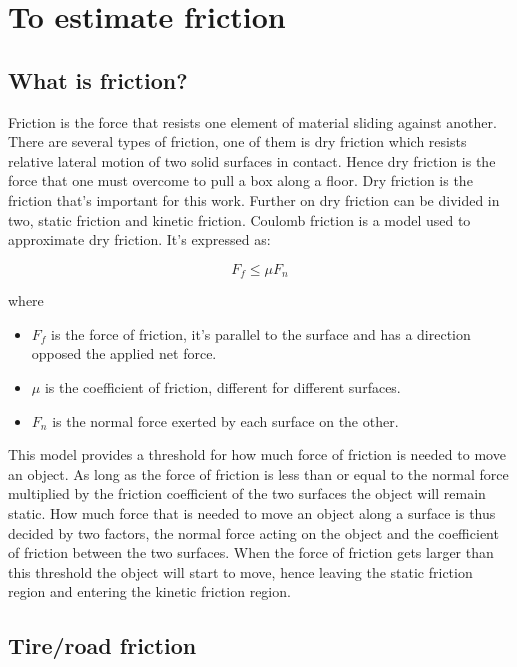\chapter{To estimate friction}

\section{What is friction?}
Friction is the force that resists one element of material sliding against another. There are several types of friction, one of them is dry friction which resists relative lateral motion of two solid surfaces in contact. Hence dry friction is the force that one must overcome to pull a box along a floor. Dry friction is the friction that's important for this work. Further on dry friction can be divided in two, static friction and kinetic friction. Coulomb friction is a model used to approximate dry friction. It's expressed as:

\begin{equation}
F_{f}\leq\mu F_{n}
\end{equation}

where

\begin{itemize}
	\item $ F_{f} $ is the force of friction, it's parallel to the surface and has a direction opposed the applied net force.
	\item $ \mu $ is the coefficient of friction, different for different surfaces.
	\item $ F_{n} $ is the normal force exerted by each surface on the other.
\end{itemize}

This model provides a threshold for how much force of friction is needed to move an object. As long as the force of friction is less than or equal to the normal force multiplied by the friction coefficient of the two surfaces the object will remain static. How much force that is needed to move an object along a surface is thus decided by two factors, the normal force acting on the object and the coefficient of friction between the two surfaces. When the force of friction gets larger than this threshold the object will start to move, hence leaving the static friction region and entering the kinetic friction region. 

\section{Tire/road friction}


